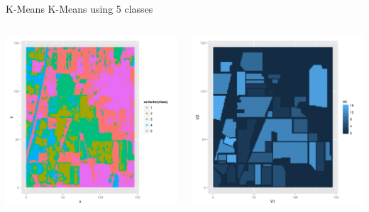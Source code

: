 \documentclass[11pt]{beamer}
\begin{document}
\begin{frame}{K-Means}
K-Means using 5 classes
\begin{columns}[T]
\begin{column}{.48\textwidth}
\includegraphics[scale=.3]{km5.png}
\end{column}
\hfill
\begin{column}{.48\textwidth}
\includegraphics[scale=.3]{gt.png}
\end{column}
\end{columns}
\end{frame}
\end{document}
